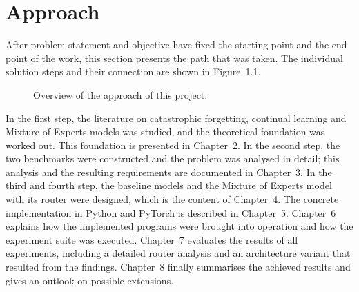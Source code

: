 \section{Approach}
\label{sec:approach}

After problem statement and objective have fixed the starting point and the
end point of the work, this section presents the path that was taken. The
individual solution steps and their connection are shown in
Figure~1.1.

\begin{figure}[H]
\centering
{}
\caption{Overview of the approach of this project.}
\label{fig:approach}
\end{figure}

In the first step, the literature on catastrophic forgetting, continual
learning and Mixture of Experts models was studied, and the theoretical
foundation was worked out. This foundation is presented in Chapter~2. In
the second step, the two benchmarks were constructed and the problem was
analysed in detail; this analysis and the resulting requirements are
documented in Chapter~3. In the third and fourth step, the baseline models
and the Mixture of Experts model with its router were designed, which is
the content of Chapter~4. The concrete implementation in Python and
PyTorch is described in Chapter~5. Chapter~6 explains how the implemented
programs were brought into operation and how the experiment suite was
executed. Chapter~7 evaluates the results of all experiments, including a
detailed router analysis and an architecture variant that resulted from the
findings. Chapter~8 finally summarises the achieved results and gives an
outlook on possible extensions.
